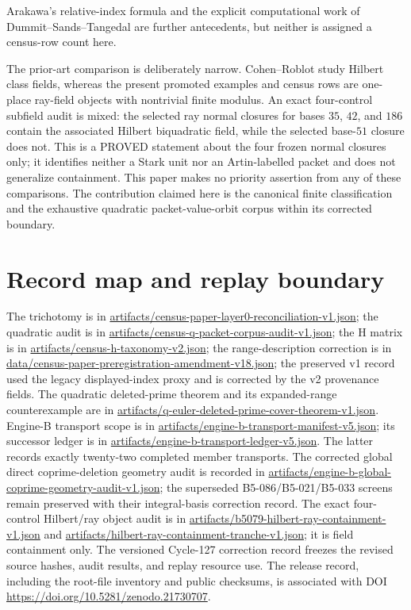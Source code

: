 \documentclass[11pt]{article}
\begin{document}
Arakawa's relative-index formula \cite{Arakawa1985} and the explicit
computational work of Dummit--Sands--Tangedal \cite{DST1997} are further
antecedents, but neither is assigned a census-row count here.

The prior-art comparison is deliberately narrow.  Cohen--Roblot study
Hilbert class fields, whereas the present promoted examples and census
rows are one-place ray-field objects with nontrivial finite modulus.
An exact four-control subfield audit is mixed: the selected ray normal
closures for bases $35$, $42$, and $186$ contain the associated Hilbert
biquadratic field, while the selected base-$51$ closure does not.
This is a PROVED statement about the four frozen normal closures only;
it identifies neither a Stark unit nor an Artin-labelled packet and
does not generalize containment.  This paper makes no priority assertion
from any of these comparisons.  The contribution claimed here is the
canonical finite classification and the exhaustive quadratic
packet-value-orbit corpus within its corrected boundary.

\appendix
\section{Record map and replay boundary}

\begin{sloppypar}
The trichotomy is in
\url{artifacts/census-paper-layer0-reconciliation-v1.json}; the
quadratic audit is in
\url{artifacts/census-q-packet-corpus-audit-v1.json}; the H matrix is
in \url{artifacts/census-h-taxonomy-v2.json}; the range-description
correction is in
\url{data/census-paper-preregistration-amendment-v18.json}; the preserved v1 record
used the legacy displayed-index proxy and is corrected by the v2
provenance fields.  The quadratic deleted-prime theorem and its
expanded-range counterexample are in
\url{artifacts/q-euler-deleted-prime-cover-theorem-v1.json}.
Engine-B transport
scope is in \url{artifacts/engine-b-transport-manifest-v5.json}; its
successor ledger is in \url{artifacts/engine-b-transport-ledger-v5.json}.
The latter records exactly twenty-two completed member transports.
The corrected global direct coprime-deletion geometry audit is recorded
in \url{artifacts/engine-b-global-coprime-geometry-audit-v1.json}; the
superseded B5-086/B5-021/B5-033 screens remain preserved with their
integral-basis correction record.
The exact four-control Hilbert/ray object audit is
in \url{artifacts/b5079-hilbert-ray-containment-v1.json} and
\url{artifacts/hilbert-ray-containment-tranche-v1.json}; it is field
containment only.  The versioned Cycle-127 correction record freezes
the revised source hashes, audit results, and replay resource use.  The
release record, including the root-file inventory and public checksums,
is associated with DOI
\url{https://doi.org/10.5281/zenodo.21730707}.
\end{sloppypar}
\end{document}
